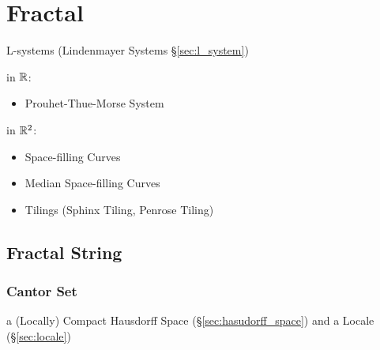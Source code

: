 \section{Fractal}\label{sec:fractal}

\asterism

L-systems (Lindenmayer Systems \S\ref{sec:l_system})


in $\mathbb{R}$:
\begin{itemize}
  \item Prouhet-Thue-Morse System
\end{itemize}

in $\mathbb{R}^2$:
\begin{itemize}
  \item Space-filling Curves
  \item Median Space-filling Curves
  \item Tilings (Sphinx Tiling, Penrose Tiling)
\end{itemize}



\subsection{Fractal String}\label{sec:fractal_string}

\subsubsection{Cantor Set}\label{sec:cantor_set}

a (Locally) Compact Hausdorff Space (\S\ref{sec:hasudorff_space}) and a Locale
(\S\ref{sec:locale})
